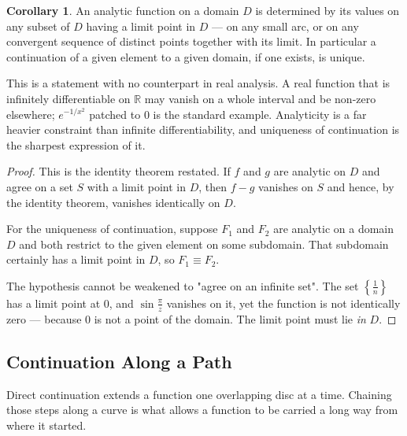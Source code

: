 \documentclass[11pt,a4paper]{article}
\theoremstyle{definition}
\newtheorem{corollary}[thm]{Corollary}
\begin{document}
\begin{corollary}
An analytic function on a domain $D$ is determined by its values on any subset of
$D$ having a limit point in $D$ --- on any small arc, or on any convergent
sequence of distinct points together with its limit. In particular a continuation
of a given element to a given domain, if one exists, is unique.

This is a statement with no counterpart in real analysis. A real function that is
infinitely differentiable on $\mathbb{R}$ may vanish on a whole interval and be
non-zero elsewhere; $e^{-1/x^2}$ patched to $0$ is the standard example.
Analyticity is a far heavier constraint than infinite differentiability, and
uniqueness of continuation is the sharpest expression of it.
\end{corollary}

\begin{proof}
This is the identity theorem restated. If $f$ and $g$ are analytic on $D$ and
agree on a set $S$ with a limit point in $D$, then $f-g$ vanishes on $S$ and
hence, by the identity theorem, vanishes identically on $D$.

For the uniqueness of continuation, suppose $F_1$ and $F_2$ are analytic on a
domain $D$ and both restrict to the given element on some subdomain. That
subdomain certainly has a limit point in $D$, so $F_1\equiv F_2$.

The hypothesis cannot be weakened to "agree on an infinite set". The set
$\left\{\frac{1}{n}\right\}$ has a limit point at $0$, and $\sin\frac{\pi}{z}$
vanishes on it, yet the function is not identically zero --- because $0$ is not
a point of the domain. The limit point must lie \emph{in} $D$.
\end{proof}

{\color[wave]{485}\subsection{Continuation Along a Path}}

Direct continuation extends a function one overlapping disc at a time. Chaining
those steps along a curve is what allows a function to be carried a long way from
where it started.
\end{document}
